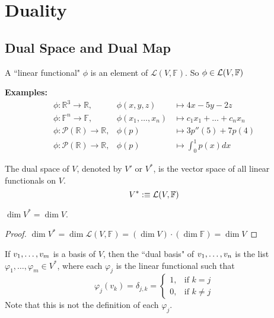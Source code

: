 \section{Duality}
\subsection{Dual Space and Dual Map}

\setcounter{thm}{107}
\begin{mydef}
  A ``linear functional" $\phi$ is an element of $\mathcal{L}(V, \mathbb{F})$. So $\phi \in \mathcal{L}(V, \mathbb{F})$
\end{mydef}

\textbf{Examples:}
\begin{equation}
  \begin{array}{lll}
    \phi: \mathbb{R}^3  \to \mathbb{R}, &\phi (x,y,z)  & \mapsto 4x-5y-2z \\
    \phi: \mathbb{F}^n  \to \mathbb{F}, &\phi (x_1, \dots, x_n)
    & \mapsto c_1x_1 + \dots + c_nx_n  \\
    \phi: \mathcal{P} (\mathbb{R})  \to \mathbb{R},
    & \phi(p) & \mapsto 3p''(5) + 7p(4) \\
    \phi: \mathcal{P}(\mathbb{R}) \to \mathbb{R},
    & \phi(p)  &\mapsto \textstyle \int_{0}^{1} p(x) dx
  \end{array}
\end{equation}

\setcounter{thm}{109}
\begin{thm}
  The dual space of $V$, denoted by $V'$ or $V^{*}$, is the vector space of all linear functionals on $V$.
  \begin{equation}
    V^{*} :\equiv \mathcal{L}(V, \mathbb{F})
  \end{equation}
\end{thm}

\begin{thm}
  $\dim V^{*} = \dim V$.
\end{thm}
\begin{proof}
  $\dim V^{*} = \dim \mathcal{L}(V, \mathbb{F})=(\dim V) \cdot (\dim \mathbb{F}) = \dim V $
\end{proof}


\begin{mydef}
  If $v_1, \dots, v_m$ is a basis of $V$, then the ``dual basis" of $v_1, \dots, v_n$ is the list $\varphi_1, \dots, \varphi_m \in V^{*}$, where each $\varphi_j$ is the linear functional such that
  \begin{equation}
    \varphi_j(v_k) = \delta_{j,k} =
  \begin{cases}
    1,  & \text{if $k=j$} \\
    0, & \text{if $k \neq j$}
  \end{cases}
  \end{equation}
  Note that this is not the definition of each $\varphi_j$.
\end{mydef}

